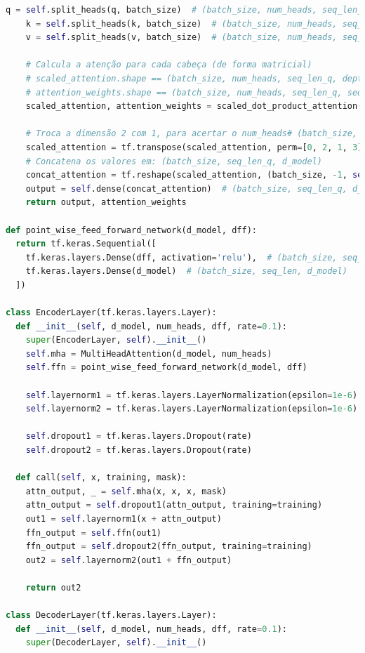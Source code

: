 \begin{lstlisting}[language=Python, style=input]
    q = self.split_heads(q, batch_size)  # (batch_size, num_heads, seq_len_q, depth)
    k = self.split_heads(k, batch_size)  # (batch_size, num_heads, seq_len_k, depth)
    v = self.split_heads(v, batch_size)  # (batch_size, num_heads, seq_len_v, depth)

    # Calcula a atenção para cada cabeça (de forma matricial)
    # scaled_attention.shape == (batch_size, num_heads, seq_len_q, depth)
    # attention_weights.shape == (batch_size, num_heads, seq_len_q, seq_len_k)
    scaled_attention, attention_weights = scaled_dot_product_attention(q, k, v, mask)

    # Troca a dimensão 2 com 1, para acertar o num_heads# (batch_size, seq_len_q, num_heads, depth)
    scaled_attention = tf.transpose(scaled_attention, perm=[0, 2, 1, 3])
    # Concatena os valores em: (batch_size, seq_len_q, d_model)
    concat_attention = tf.reshape(scaled_attention, (batch_size, -1, self.d_model))
    output = self.dense(concat_attention)  # (batch_size, seq_len_q, d_model)
    return output, attention_weights

def point_wise_feed_forward_network(d_model, dff):
  return tf.keras.Sequential([
    tf.keras.layers.Dense(dff, activation='relu'),  # (batch_size, seq_len, dff)
    tf.keras.layers.Dense(d_model)  # (batch_size, seq_len, d_model)
  ])

class EncoderLayer(tf.keras.layers.Layer):
  def __init__(self, d_model, num_heads, dff, rate=0.1):
    super(EncoderLayer, self).__init__()
    self.mha = MultiHeadAttention(d_model, num_heads)
    self.ffn = point_wise_feed_forward_network(d_model, dff)

    self.layernorm1 = tf.keras.layers.LayerNormalization(epsilon=1e-6)
    self.layernorm2 = tf.keras.layers.LayerNormalization(epsilon=1e-6)

    self.dropout1 = tf.keras.layers.Dropout(rate)
    self.dropout2 = tf.keras.layers.Dropout(rate)

  def call(self, x, training, mask):
    attn_output, _ = self.mha(x, x, x, mask)
    attn_output = self.dropout1(attn_output, training=training)
    out1 = self.layernorm1(x + attn_output)
    ffn_output = self.ffn(out1)
    ffn_output = self.dropout2(ffn_output, training=training)
    out2 = self.layernorm2(out1 + ffn_output)

    return out2

class DecoderLayer(tf.keras.layers.Layer):
  def __init__(self, d_model, num_heads, dff, rate=0.1):
    super(DecoderLayer, self).__init__()


\end{lstlisting}

